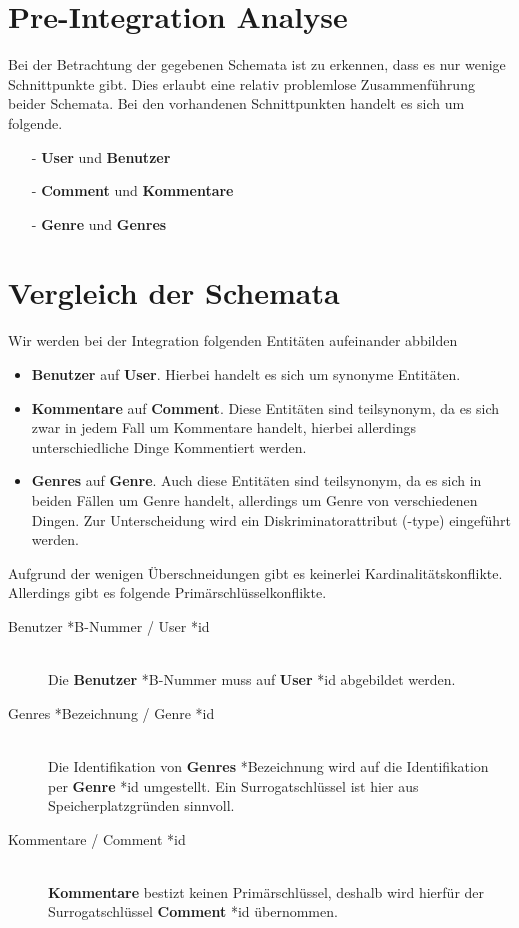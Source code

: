 \documentclass[11pt,a4paper,DIV=9]{scrartcl}
\begin{document}
\section{Pre-Integration Analyse}
  Bei der Betrachtung der gegebenen Schemata ist zu erkennen, dass es nur wenige Schnittpunkte gibt. Dies erlaubt eine relativ problemlose Zusammenführung beider Schemata.
  Bei den vorhandenen Schnittpunkten handelt es sich um folgende.
  \begin{itemize}
    \item[-] \textbf{User} und \textbf{Benutzer}
    \item[-] \textbf{Comment} und \textbf{Kommentare}
    \item[-] \textbf{Genre} und \textbf{Genres}
  \end{itemize}

\section{Vergleich der Schemata}
  Wir werden bei der Integration folgenden Entitäten aufeinander abbilden
  \begin{itemize}
    \item \textbf{Benutzer} auf \textbf{User}. Hierbei handelt es sich um synonyme Entitäten.
    \item \textbf{Kommentare} auf \textbf{Comment}. Diese Entitäten sind teilsynonym, da es sich zwar in jedem Fall um Kommentare handelt, hierbei allerdings unterschiedliche Dinge Kommentiert werden.
    \item \textbf{Genres} auf \textbf{Genre}. Auch diese Entitäten sind teilsynonym, da es sich in beiden Fällen um Genre handelt, allerdings um Genre von verschiedenen Dingen. Zur Unterscheidung wird ein Diskriminatorattribut (-type) eingeführt werden. 
  \end{itemize}

  Aufgrund der wenigen Überschneidungen gibt es keinerlei Kardinalitätskonflikte. Allerdings gibt es folgende Primärschlüsselkonflikte.
  \begin{description}
    \item[Benutzer *B-Nummer / User *id] \hfill \\
      Die \textbf{Benutzer} *B-Nummer muss auf \textbf{User} *id abgebildet werden.
    \item[Genres *Bezeichnung / Genre *id] \hfill \\
      Die Identifikation von \textbf{Genres} *Bezeichnung wird auf die Identifikation per \textbf{Genre} *id umgestellt. Ein Surrogatschlüssel ist hier aus Speicherplatzgründen sinnvoll.
    \item[Kommentare / Comment *id] \hfill \\
      \textbf{Kommentare} bestizt keinen Primärschlüssel, deshalb wird hierfür der Surrogatschlüssel \textbf{Comment} *id übernommen.
  \end{description}
  
\end{document}

